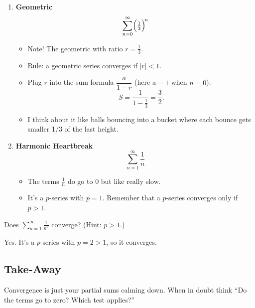 \documentclass{article}
\begin{document}
\begin{enumerate}[label=\textbf{\arabic*.},topsep=4pt,itemsep=10pt]

  \item \textbf{Geometric}
        \[
        \sum_{n=0}^{\infty}\Bigl(\tfrac13\Bigr)^{\!n}
        \]
        \begin{itemize}[itemsep=2pt]
          \item Note! The geometric with ratio \(r=\tfrac13\).
          \item Rule: a geometric series converges if \(|r|<1\).
          \item Plug \(r\) into the sum formula \(\dfrac{a}{1-r}\)
                (here \(a=1\) when \(n=0\)):
                \[
                  S = \frac{1}{1-\tfrac13} = \frac32.
                \]
          \item I think about it like balls bouncing into a bucket where each bounce gets smaller 1/3 of the last height.
        \end{itemize}

  \item \textbf{Harmonic Heartbreak}
        \[
        \sum_{n=1}^{\infty}\frac1n
        \]
        \begin{itemize}[itemsep=2pt]
          \item The terms \(\tfrac1n\) do go to \(0\) but like really slow.
          \item It’s a \(p\)-series with \(p=1\). Remember that a \(p\)-series converges only if \(p>1\).
        \end{itemize}

\end{enumerate}

\begin{tcolorbox}[colback=green!5!white,colframe=green!50!black,title=Quick-Check]
Does \( \displaystyle\sum_{n=1}^{\infty}\frac{1}{n^{2}} \) converge? (Hint: \(p>1\).)

\begin{tcolorbox}[colback=white, sharp corners, boxrule=0pt, title=Spoiler – click to reveal, breakable]
Yes. It’s a \(p\)-series with \(p=2>1\), so it converges.
\end{tcolorbox}
\end{tcolorbox}

\subsection*{Take-Away}
Convergence is just your partial sums calming down.
When in doubt think “Do the terms go to zero? Which test applies?”
\end{document}
